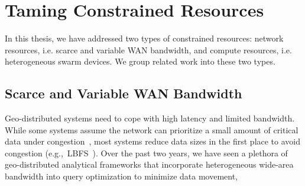 \documentclass[thesis.tex]{subfiles}
\begin{document}




\section{Taming Constrained Resources}
\label{sec:taming-constr-reso}

In this thesis, we have addressed two types of constrained resources: network
resources, i.e. scarce and variable WAN bandwidth, and compute resources,
i.e. heterogeneous swarm devices. We group related work into these two types.

\subsection{Scarce and Variable WAN Bandwidth}
\label{sec:scarce-variable-wan}

Geo-distributed systems need to cope with high latency and limited
bandwidth. While some systems assume the network can prioritize a small amount
of critical data under congestion~\cite{cho2012surviving}, most systems reduce
data sizes in the first place to avoid congestion
(e.g.,~LBFS~\cite{muthitacharoen2001low}). Over the past two years, we have seen
a plethora of geo-distributed analytical frameworks that incorporate
heterogeneous wide-area bandwidth into query optimization to minimize data
movement,
\end{document}

